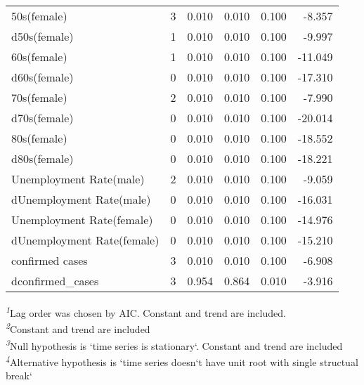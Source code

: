 \begin{longtable}{lrrrrr}
50s(female) & 3 & 0.010 & 0.010 & 0.100 & -8.357 \\ 
d50s(female) & 1 & 0.010 & 0.010 & 0.100 & -9.997 \\ 
60s(female) & 1 & 0.010 & 0.010 & 0.100 & -11.049 \\ 
d60s(female) & 0 & 0.010 & 0.010 & 0.100 & -17.310 \\ 
70s(female) & 2 & 0.010 & 0.010 & 0.100 & -7.990 \\ 
d70s(female) & 0 & 0.010 & 0.010 & 0.100 & -20.014 \\ 
80s(female) & 0 & 0.010 & 0.010 & 0.100 & -18.552 \\ 
d80s(female) & 0 & 0.010 & 0.010 & 0.100 & -18.221 \\ 
Unemployment Rate(male) & 2 & 0.010 & 0.010 & 0.100 & -9.059 \\ 
dUnemployment Rate(male) & 0 & 0.010 & 0.010 & 0.100 & -16.031 \\ 
Unemployment Rate(female) & 0 & 0.010 & 0.010 & 0.100 & -14.976 \\ 
dUnemployment Rate(female) & 0 & 0.010 & 0.010 & 0.100 & -15.210 \\ 
confirmed cases & 3 & 0.010 & 0.010 & 0.100 & -6.908 \\ 
dconfirmed\_cases & 3 & 0.954 & 0.864 & 0.010 & -3.916 \\ 
\bottomrule
\end{longtable}
\begin{minipage}{\linewidth}
\textsuperscript{\textit{1}}Lag order was chosen by AIC.
Constant and trend are included.\\
\textsuperscript{\textit{2}}Constant and trend are included\\
\textsuperscript{\textit{3}}Null hypothesis is `time series is stationary`.
Constant and trend are included\\
\textsuperscript{\textit{4}}Alternative hypothesis is `time series doesn`t have unit root with single structual break`\\
\end{minipage}

